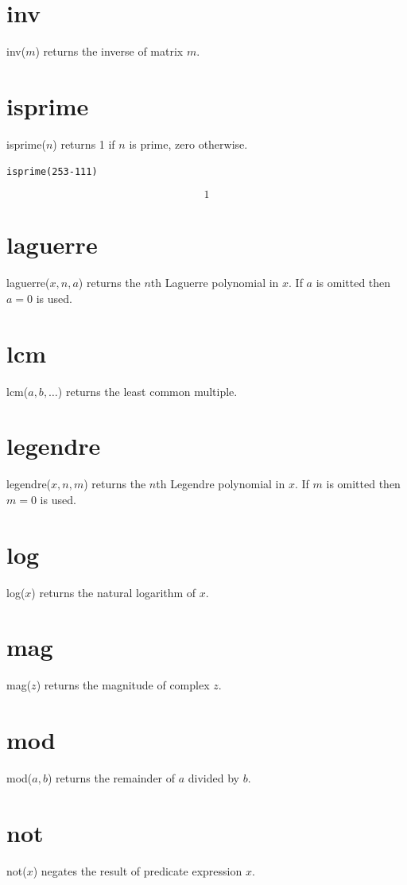 \documentclass[12pt]{book}
\begin{document}
\section*{inv}
inv($m$) returns the inverse of matrix $m$.

\section*{isprime}
isprime($n$) returns 1 if $n$ is prime, zero otherwise.

\medskip
{\tt isprime(2{}53-111)}

$$1$$

\section*{laguerre}
laguerre($x,n,a$) returns the $n$th Laguerre polynomial in $x$.
If $a$ is omitted then $a=0$ is used.

\section*{lcm}
lcm($a,b,\ldots$) returns the least common multiple.

\section*{legendre}
legendre($x,n,m$) returns the $n$th Legendre polynomial in $x$.
If $m$ is omitted then $m=0$ is used.

\section*{log}
log($x$) returns the natural logarithm of $x$.

\section*{mag}
mag($z$) returns the magnitude of complex $z$.

\section*{mod}
mod($a,b$) returns the remainder of $a$ divided by $b$.

\section*{not}
not($x$) negates the result of predicate expression $x$.
\end{document}
